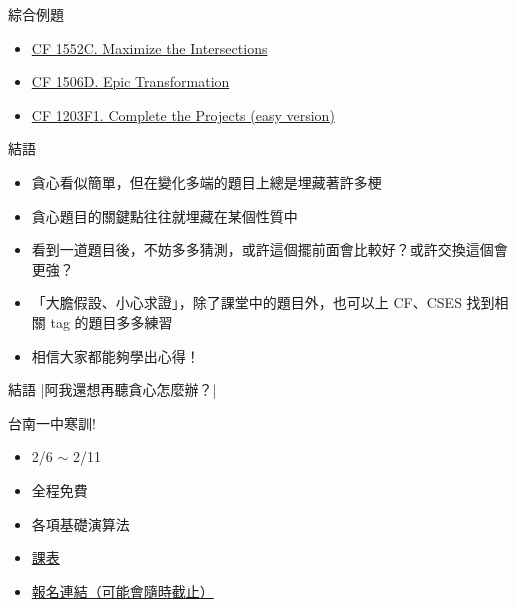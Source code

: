\documentclass[aspectratio=169]{beamer}
\begin{document}
    \begin{frame}{綜合例題}
        \begin{itemize}
            \item \href{https://codeforces.com/contest/1552/problem/C}{CF 1552C. Maximize the Intersections}
            \item \href{C. Maximize the Intersections}{CF 1506D. Epic Transformation}
            \item \href{https://codeforces.com/problemset/problem/1203/F1}{CF 1203F1. Complete the Projects (easy version)}
        \end{itemize}
    \end{frame}

    \begin{frame}{結語}
        \begin{itemize}
            \item<1-> 貪心看似簡單，但在變化多端的題目上總是埋藏著許多梗
            \item<2-> 貪心題目的關鍵點往往就埋藏在某個性質中
            \item<3-> 看到一道題目後，不妨多多猜測，或許這個擺前面會比較好？或許交換這個會更強？
            \item<4-> 「大膽假設、小心求證」，除了課堂中的題目外，也可以上 CF、CSES 找到相關 tag 的題目多多練習
            \item<5-> 相信大家都能夠學出心得！
        \end{itemize}
    \end{frame}

    \begin{frame}{結語}
        \big|阿我還想再聽貪心怎麼辦？\big|
    \end{frame}

    \begin{frame}{台南一中寒訓!}
        \begin{itemize}
            \item 2/6 $\sim$ 2/11
            \item 全程免費
            \item 各項基礎演算法
            \item \href{http://gg.gg/T25WinterSchedule}{課表}
            \item \href{https://forms.gle/HMuuRkxXUHSjCCjG9}{報名連結（可能會隨時截止）}
        \end{itemize}
    \end{frame}
\end{document}
